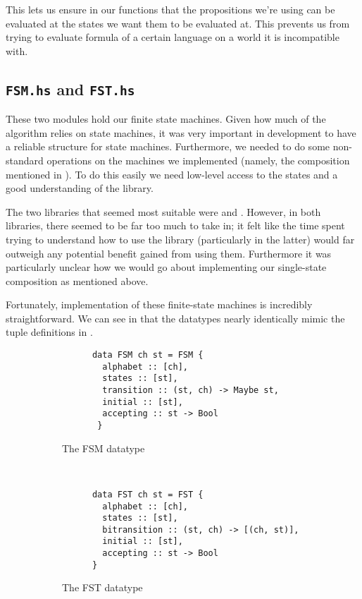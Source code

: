 \documentclass[12pt, a4paper]{article}
\begin{document}
This lets us ensure in our functions that the propositions we're using can be
evaluated at the states we want them to be evaluated at. This prevents us from
trying to evaluate formula of a certain language on a world it is incompatible
with.

\subsection{\texttt{FSM.hs} and \texttt{FST.hs}}

These two modules hold our finite state machines. Given how much of the
algorithm relies on state machines, it was very important in development to have
a reliable structure for state machines. Furthermore, we needed to do some
non-standard operations on the machines we implemented (namely, the composition
mentioned in ). To do this easily we need
low-level access to the states and a good understanding of the library. 

The two libraries that seemed most suitable were \cite{HaskellFST} and
\cite{HaskellMachines}. However, in both libraries, there seemed to be far too
much to take in; it felt like the time spent trying to understand how to use the
library (particularly in the latter) would far outweigh any potential benefit
gained from using them. Furthermore it was particularly unclear how we would go
about implementing our single-state composition as mentioned above.

\bigskip

Fortunately, implementation of these finite-state machines is incredibly
straightforward. We can see in  that the datatypes nearly
identically mimic the tuple definitions in .


\begin{figure}[h]
  \centering
  \begin{subfigure}[b]{0.5\textwidth}
    \begin{verbatim}
      data FSM ch st = FSM {
        alphabet :: [ch],              
        states :: [st],               
        transition :: (st, ch) -> Maybe st,
        initial :: [st],            
        accepting :: st -> Bool    
       }
    \end{verbatim}
    \caption{The FSM datatype}
  \end{subfigure}%
~
  \begin{subfigure}[b]{0.5\textwidth}
    \begin{verbatim}
      data FST ch st = FST {
        alphabet :: [ch],                     
        states :: [st],                       
        bitransition :: (st, ch) -> [(ch, st)],
        initial :: [st],                      
        accepting :: st -> Bool              
      }
    \end{verbatim}
    \caption{The FST datatype}
  \end{subfigure}
  \caption{}
  \label{fig:FSMFST}
\end{figure}
\end{document}
